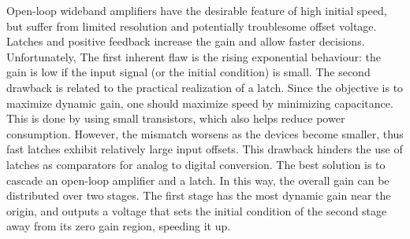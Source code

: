 


Open-loop wideband amplifiers have the desirable feature of high initial speed, but suffer from limited resolution and potentially troublesome offset voltage. Latches and positive feedback increase the gain and allow faster decisions. Unfortunately, The first inherent flaw is the rising exponential behaviour: the gain is low if the input signal (or the initial condition) is small.
The second drawback is related to the practical realization of a latch. Since the objective is to maximize dynamic gain, one should maximize speed by minimizing capacitance. This is done by using small transistors, which also helps reduce power consumption. However, the mismatch worsens as the devices become smaller, thus fast latches exhibit relatively large input offsets. This drawback hinders the use of latches as comparators for analog to digital conversion.
The best solution is to cascade an open-loop amplifier and a latch. In this way, the overall gain can be distributed over two stages. The first stage has the most dynamic gain near the origin, and outputs a voltage that sets the initial condition of the second stage away from its zero gain region, speeding it up.

